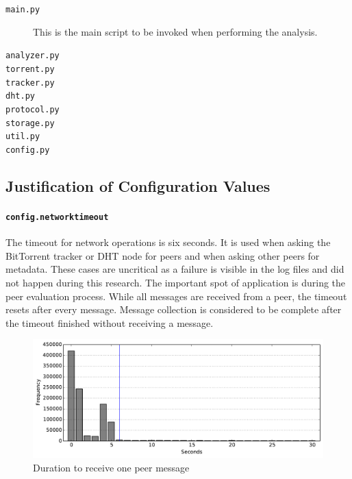 \documentclass[10pt, a4paper, twoside]{scrartcl}
\renewcommand{\_}{\origunderscore\allowbreak}
\newcommand{\config}[1]{\texttt{config.\allowbreak #1}}
\begin{document}
\begin{description}
  \item[\texttt{main.py}] This is the main script to be invoked when performing the analysis.
  \item[\texttt{analyzer.py}]
  \item[\texttt{torrent.py}]
  \item[\texttt{tracker.py}]
  \item[\texttt{dht.py}]
  \item[\texttt{protocol.py}]
  \item[\texttt{storage.py}]
  \item[\texttt{util.py}]
  \item[\texttt{config.py}]
\end{description}

\subsection{Justification of Configuration Values}
\paragraph{\config{network\_timeout}}
The timeout for network operations is six seconds. It is used when asking the BitTorrent tracker or DHT node for peers and when asking other peers for metadata. These cases are uncritical as a failure is visible in the log files and did not happen during this research. The important spot of application is during the peer evaluation process. While all messages are received from a peer, the timeout resets after every message. Message collection is considered to be complete after the timeout finished without receiving a message.

\begin{figure}
\centering
\includegraphics[width=\textwidth]{2015-08-14_17-46-44_faui1-246_timeout}
\caption{Duration to receive one peer message}
\label{timeout-calibration}
\end{figure}
\end{document}
